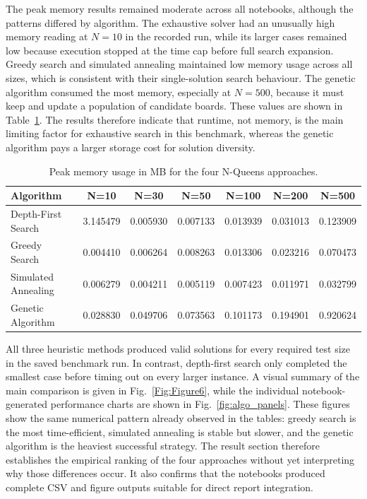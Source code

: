 \documentclass[conference]{IEEEtran}
\begin{document}
The peak memory results remained moderate across all notebooks, although the patterns differed by algorithm. The exhaustive solver had an unusually high memory reading at $N=10$ in the recorded run, while its larger cases remained low because execution stopped at the time cap before full search expansion. Greedy search and simulated annealing maintained low memory usage across all sizes, which is consistent with their single-solution search behaviour. The genetic algorithm consumed the most memory, especially at $N=500$, because it must keep and update a population of candidate boards. These values are shown in Table~\ref{tab:memory_results}. The results therefore indicate that runtime, not memory, is the main limiting factor for exhaustive search in this benchmark, whereas the genetic algorithm pays a larger storage cost for solution diversity.

\begin{table}[!ht]
\centering
\caption{Peak memory usage in MB for the four N-Queens approaches.}
\label{tab:memory_results}
\begin{tabular}{|l|c|c|c|c|c|c|}
\hline
\textbf{Algorithm} & \textbf{N=10} & \textbf{N=30} & \textbf{N=50} & \textbf{N=100} & \textbf{N=200} & \textbf{N=500} \\ \hline
Depth-First Search & 3.145479 & 0.005930 & 0.007133 & 0.013939 & 0.031013 & 0.123909 \\ \hline
Greedy Search & 0.004410 & 0.006264 & 0.008263 & 0.013306 & 0.023216 & 0.070473 \\ \hline
Simulated Annealing & 0.006279 & 0.004211 & 0.005119 & 0.007423 & 0.011971 & 0.032799 \\ \hline
Genetic Algorithm & 0.028830 & 0.049706 & 0.073563 & 0.101173 & 0.194901 & 0.920624 \\ \hline
\end{tabular}
\end{table}

All three heuristic methods produced valid solutions for every required test size in the saved benchmark run. In contrast, depth-first search only completed the smallest case before timing out on every larger instance. A visual summary of the main comparison is given in Fig.~\ref{Fig:Figure6}, while the individual notebook-generated performance charts are shown in Fig.~\ref{fig:algo_panels}. These figures show the same numerical pattern already observed in the tables: greedy search is the most time-efficient, simulated annealing is stable but slower, and the genetic algorithm is the heaviest successful strategy. The result section therefore establishes the empirical ranking of the four approaches without yet interpreting why those differences occur. It also confirms that the notebooks produced complete CSV and figure outputs suitable for direct report integration.
\end{document}
